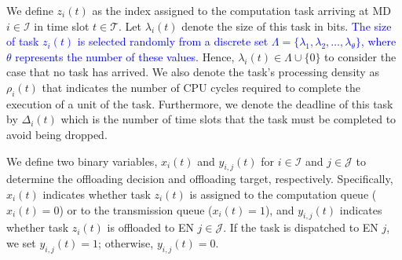\documentclass[10pt, journal,letterpaper]{IEEEtran}
\begin{document}
We define $z_i(t)$ as the index assigned to the computation task arriving at MD $i \in \mathcal{I}$ in time slot $t \in \mathcal{T}$. Let $\lambda_i(t)$ denote the size of this task in bits. \textcolor{blue}{The size of task $z_i(t)$ is selected randomly from a discrete set $\Lambda = \{\lambda_1, \lambda_2, \ldots, \lambda_{\theta}\}$, where $\theta$ represents the number of these values.} Hence, $\lambda_i(t) \in \Lambda \cup \{0\}$ to consider the case that no task has arrived. We also denote the task's processing density as $\rho_i(t)$ that indicates the number of CPU cycles required to complete the execution of a unit of the task. Furthermore, we denote the deadline of this task by $\Delta_i(t)$ which is the number of time slots that the task must be completed to avoid being dropped.

We define two binary variables, $x_i(t)$ and $y_{i,j}(t)$ for $i \in \mathcal{I}$ and $j \in \mathcal{J}$ to determine the offloading decision and offloading target, respectively. Specifically, $x_i(t)$ indicates whether task $z_i(t)$ is assigned to the computation queue ($x_i(t) = 0$) or to the transmission queue ($x_i(t) = 1$), and $y_{i,j}(t)$ indicates whether task $z_i(t)$ is offloaded to EN $j \in \mathcal{J}$. If the task is dispatched to EN $j$, we set $y_{i,j}(t) = 1$; otherwise, $y_{i,j}(t) = 0$.


 
\end{document}
